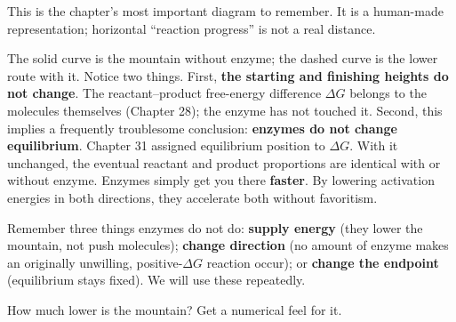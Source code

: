 This is the chapter's most important diagram to remember. It is a human-made representation; horizontal ``reaction progress'' is not a real distance.

\begin{center}
\end{center}

The solid curve is the mountain without enzyme; the dashed curve is the lower route with it. Notice two things. First, \textbf{the starting and finishing heights do not change}. The reactant--product free-energy difference $\Delta G$ belongs to the molecules themselves (Chapter 28); the enzyme has not touched it. Second, this implies a frequently troublesome conclusion: \textbf{enzymes do not change equilibrium}. Chapter 31 assigned equilibrium position to $\Delta G$. With it unchanged, the eventual reactant and product proportions are identical with or without enzyme. Enzymes simply get you there \textbf{faster}. By lowering activation energies in both directions, they accelerate both without favoritism.

Remember three things enzymes do not do: \textbf{supply energy} (they lower the mountain, not push molecules); \textbf{change direction} (no amount of enzyme makes an originally unwilling, positive-$\Delta G$ reaction occur); or \textbf{change the endpoint} (equilibrium stays fixed). We will use these repeatedly.

How much lower is the mountain? Get a numerical feel for it.

